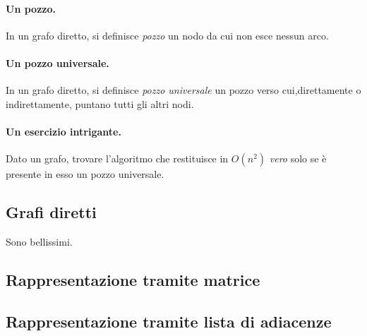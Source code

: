 \paragraph{Un pozzo.}
In un grafo diretto, si definisce \textit{pozzo} un nodo da cui non esce nessun arco.
\paragraph{Un pozzo universale.}
In un grafo diretto, si definisce \textit{pozzo universale} un pozzo verso cui,direttamente o indirettamente, puntano tutti gli altri nodi.

\paragraph{Un esercizio intrigante.}
Dato un grafo, trovare l'algoritmo che restituisce in $ O(n^2) $ \textit{vero} solo se è presente in esso un pozzo universale.

\subsection{Grafi diretti}
Sono bellissimi.
\subsection{Rappresentazione tramite matrice}
\subsection{Rappresentazione tramite lista di adiacenze}